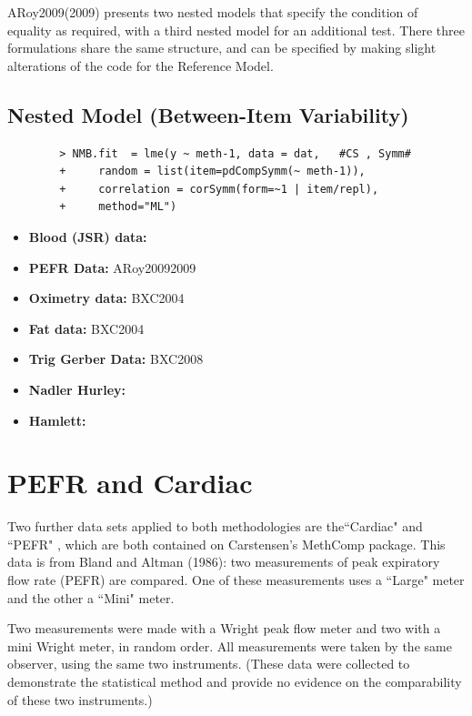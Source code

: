 \documentclass[12pt, a4paper]{report}
\theoremstyle{plain}
\theoremstyle{definition}
\theoremstyle{remark}
\begin{document}
	
	ARoy2009(2009) presents two nested models that specify the condition of equality as required, with a third nested model for an additional test. There three formulations share the same structure, and can be specified by making slight alterations of the code for the Reference Model.
	
	\subsection{Nested Model (Between-Item Variability)}
	\begin{framed}
		\begin{verbatim}
		> NMB.fit  = lme(y ~ meth-1, data = dat,   #CS , Symm#
		+     random = list(item=pdCompSymm(~ meth-1)),
		+     correlation = corSymm(form=~1 | item/repl), 
		+     method="ML")
		\end{verbatim}
	\end{framed}
	
	
	
	
	\begin{itemize}
		\item \textbf{Blood (JSR) data:} 
		\item \textbf{PEFR Data:} ARoy20092009
		\item \textbf{Oximetry data:} BXC2004
		\item \textbf{Fat data:} BXC2004
		\item \textbf{Trig Gerber Data:} BXC2008
		\item \textbf{Nadler Hurley:}
		\item \textbf{Hamlett:}
	\end{itemize}
	\newpage
	\section{PEFR and Cardiac}
	
	
	Two further data sets applied to both methodologies are the``Cardiac" and ``PEFR" , which are both contained on Carstensen's MethComp package. This data is from Bland and Altman (1986): two measurements of peak expiratory flow rate (PEFR) are compared. One of these measurements uses a ``Large" meter and the other a ``Mini" meter.
	
	Two measurements were made with a Wright peak flow meter and two with a mini Wright meter, in random order.  All measurements were taken by the same observer, using the same two instruments. (These data were collected to demonstrate the statistical method and provide no evidence on the comparability of these two instruments.)
	
\end{document}
